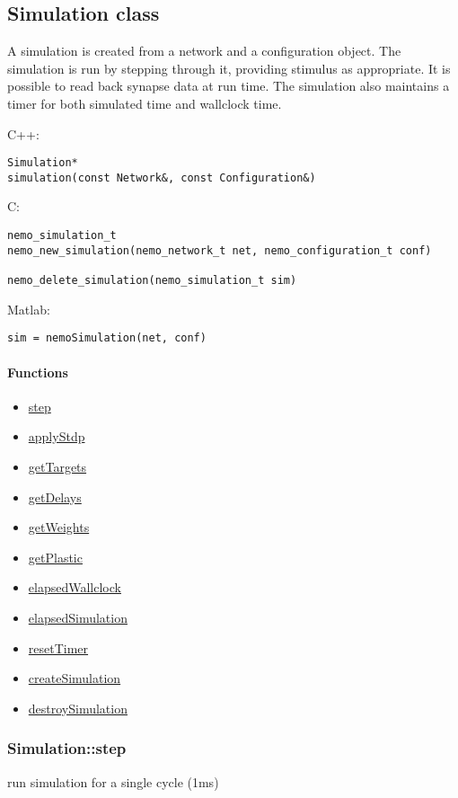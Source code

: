 \clearpage
\subsection{Simulation class}
\label{Simulation}
A simulation is created from a network and a configuration object. The simulation is run by stepping through it, providing stimulus as appropriate. It is possible to read back synapse data at run time. The simulation also maintains a timer for both simulated time and wallclock time.

\noindent C++:
\begin{lstlisting}[aboveskip=2pt]
Simulation*
simulation(const Network&, const Configuration&)
\end{lstlisting}

\noindent C:
\begin{lstlisting}[aboveskip=2pt]
nemo_simulation_t
nemo_new_simulation(nemo_network_t net, nemo_configuration_t conf)
 
nemo_delete_simulation(nemo_simulation_t sim)
\end{lstlisting}

\noindent Matlab:
\begin{lstlisting}[aboveskip=2pt]
sim = nemoSimulation(net, conf)
\end{lstlisting}
\paragraph{Functions}
\begin{itemize}
\item \hyperref[fn: step]{step}
\item \hyperref[fn: applyStdp]{applyStdp}
\item \hyperref[fn: getTargets]{getTargets}
\item \hyperref[fn: getDelays]{getDelays}
\item \hyperref[fn: getWeights]{getWeights}
\item \hyperref[fn: getPlastic]{getPlastic}
\item \hyperref[fn: elapsedWallclock]{elapsedWallclock}
\item \hyperref[fn: elapsedSimulation]{elapsedSimulation}
\item \hyperref[fn: resetTimer]{resetTimer}
\item \hyperref[fn: createSimulation]{createSimulation}
\item \hyperref[fn: destroySimulation]{destroySimulation}
\end{itemize}
\clearpage
\subsubsection*{Simulation::step}
\label{fn: step}
run simulation for a single cycle (1ms)



